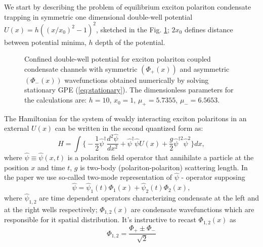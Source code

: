 \documentclass[aps, pre, preprint, groupedaddress, superscriptaddress, showkeys, showpacs] {revtex4-1}
\begin{document}
We start by describing the problem of equilibrium exciton polariton condensate trapping in symmetric one dimensional double-well potential $U(x) = h ((x/x_0)^2 - 1)^2$, sketched in the Fig. \ref{pic:potential_sym_asym}; $2x_0$ defines distance between potential minima, $h$ depth of the potential.
% 
\begin{figure}[ht]
\caption{
Confined double-well potential for exciton polariton coupled condensate channels with symmetric $(\Phi_+(x))$ and asymmetric $(\Phi_-(x))$ wavefunctions obtained numerically by solving stationary GPE (\ref{eq:stationary}).
The dimensionless parameters for the calculations are: $h = 10$, $x_0 = 1$, $\mu_+ = 5.7355$, $\mu_- = 6.5653$.
\label{pic:potential_sym_asym}
}
\end{figure}
%
The Hamiltonian for the system of weakly interacting exciton polaritons in an external $U(x)$ can be written in the second quantized form as:
%
\begin{equation}
\hat{H} = \int \Big\{ -\dfrac{1}{2} \hat{\psi}^\dag \dfrac{d^2 \hat{\psi}}{dx^2} + \hat{\psi}^\dag \hat{\psi} U(x) + \dfrac{g}{2} \hat{\psi}^{\dag 2} \hat{\psi}^2  \Big\} dx,
\label{eq:gpe_hamiltonian}
\end{equation}
%
where $\hat{\psi} \equiv \hat{\psi}(x, t)$ is a polariton field operator that annihilate a particle at the position $x$ and time $t$, $g$ is two-body (polariton-polariton) scattering length.
In the paper we use so-called two-mode representation of $\hat{\psi}$ - operator supposing
%
\begin{equation}
\hat{\psi} = \hat{\psi}_1(t) \Phi_1(x) + \hat{\psi}_2(t) \Phi_2(x),
\label{eq:two_modes}
\end{equation}
%
where $\hat{\psi}_{1,2}$ are time dependent operators characterizing condensate at the left and at the right wells respectively; $\Phi_{1,2}(x)$ are condensate wavefunctions which are responsible for it spatial distribution.
It's instructive to recast $\Phi_{1,2}(x)$ as
%
\begin{equation}
\Phi_{1,2} = \dfrac{\Phi_+ \pm \Phi_-}{\sqrt{2}}
\label{eq:basic_modes}
\end{equation}
\end{document}
